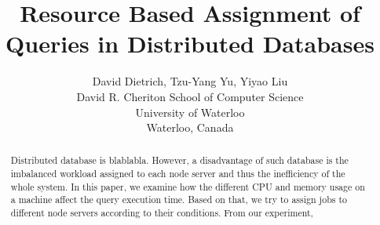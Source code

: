\documentclass[]{acm_proc_article-sp}
\begin{document}
\title{Resource Based Assignment of Queries in Distributed Databases}

\author{
  David Dietrich, Tzu-Yang Yu, Yiyao Liu \\
  David R. Cheriton School of Computer Science \\
  University of Waterloo \\
  Waterloo, Canada \\
}

\maketitle


\begin{abstract}
Distributed database is blablabla. However, a disadvantage of such database is the imbalanced workload assigned to each node server and thus the inefficiency of the whole system. In this paper, we examine how the different CPU and memory usage on a machine affect the query execution time.  Based on that, we try to assign jobs to different node servers according to their conditions. From our experiment, 
\end{abstract}











\end{document}
